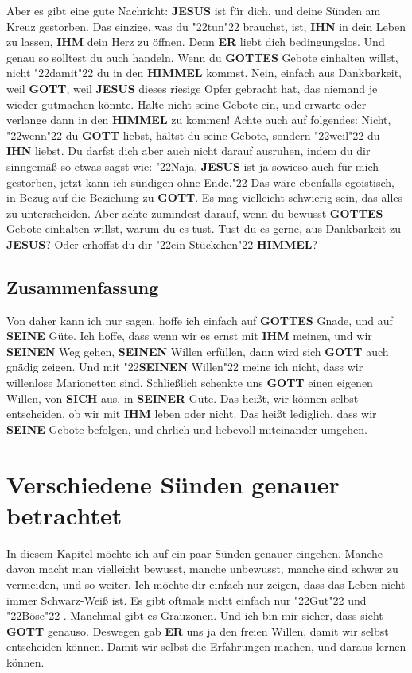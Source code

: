 \documentclass[10pt,a5paper]{article}
\newcommand{\Er}[0]{\textbf{ER}}
\newcommand{\Gottes}[0]{\textbf{GOTTES}}
\newcommand{\Gott}[0]{\textbf{GOTT}}
\newcommand{\Himmel}[0]{\textbf{HIMMEL}}
\newcommand{\Ihm}[0]{\textbf{IHM}}
\newcommand{\Ihn}[0]{\textbf{IHN}}
\newcommand{\Jesus}[0]{\textbf{JESUS}}
\newcommand{\Seinen}[0]{\textbf{SEINEN}}
\newcommand{\Seiner}[0]{\textbf{SEINER}}
\newcommand{\Seine}[0]{\textbf{SEINE}}
\newcommand{\Sich}[0]{\textbf{SICH}}
\newcommand{\q}[1]{\char"22{#1}\char"22 }
\begin{document}
		Aber es gibt eine gute Nachricht:
		{\Jesus} ist f\"ur dich,
		und deine S\"unden am Kreuz gestorben.
		Das einzige,
		was du \q{tun} brauchst,
		ist,
		{\Ihn} in dein Leben zu lassen,
		{\Ihm} dein Herz zu \"offnen.
		Denn {\Er} liebt dich bedingungslos.
		Und genau so solltest du auch handeln.
		Wenn du {\Gottes} Gebote einhalten willst,
		nicht \q{damit} du in den {\Himmel} kommst.
		Nein,
		einfach aus Dankbarkeit,
		weil {\Gott},
		weil {\Jesus} dieses riesige Opfer gebracht hat,
		das niemand je wieder gutmachen k\"onnte.
		Halte nicht seine Gebote ein,
		und erwarte oder verlange dann in den {\Himmel} zu kommen!
		Achte auch auf folgendes:
		Nicht,
		\q{wenn} du {\Gott} liebst, h\"altst du seine Gebote,
		sondern \q{weil} du {\Ihn} liebst.
		Du darfst dich aber auch nicht darauf ausruhen,
		indem du dir sinngem\"a{\ss} so etwas sagst wie:
		\q{Naja,
		{\Jesus} ist ja sowieso auch f\"ur mich gestorben,
		jetzt kann ich s\"undigen ohne Ende.}
		Das w\"are ebenfalls egoistisch,
		in Bezug auf die Beziehung zu {\Gott}.
		Es mag vielleicht schwierig sein,
		das alles zu unterscheiden.
		Aber achte zumindest darauf,
		wenn du bewusst {\Gottes} Gebote einhalten willst,
		warum du es tust.
		Tust du es gerne,
		aus Dankbarkeit zu {\Jesus}?
		Oder erhoffst du dir \q{ein St\"uckchen} {\Himmel}?
		
	\subsection{Zusammenfassung}
		Von daher kann ich nur sagen,
		hoffe ich einfach auf {\Gottes} Gnade,
		und auf {\Seine} G\"ute.
		Ich hoffe,
		dass wenn wir es ernst mit {\Ihm} meinen,
		und wir {\Seinen} Weg gehen,
		{\Seinen} Willen erf\"ullen,
		dann wird sich {\Gott} auch gn\"adig zeigen.
		Und mit \q{{\Seinen} Willen} meine ich nicht,
		dass wir willenlose Marionetten sind.
		Schlie{\ss}lich schenkte uns {\Gott} einen eigenen Willen,
		von {\Sich} aus,
		in {\Seiner} G\"ute.
		Das hei{\ss}t,
		wir k\"onnen selbst entscheiden,
		ob wir mit {\Ihm} leben oder nicht.
		Das hei{\ss}t lediglich,
		dass wir {\Seine} Gebote befolgen,
		und ehrlich und liebevoll miteinander umgehen.

	\newpage
	\section{Verschiedene S\"unden genauer betrachtet}
		In diesem Kapitel m\"ochte ich auf ein paar S\"unden genauer eingehen.
		Manche davon macht man vielleicht bewusst,
		manche unbewusst,
		manche sind schwer zu vermeiden,
		und so weiter.
		Ich m\"ochte dir einfach nur zeigen,
		dass das Leben nicht immer Schwarz-Wei{\ss} ist.
		Es gibt oftmals nicht einfach nur \q{Gut} und \q{B\"ose}.
		Manchmal gibt es Grauzonen.
		Und ich bin mir sicher,
		dass sieht {\Gott} genauso.
		Deswegen gab {\Er} uns ja den freien Willen,
		damit wir selbst entscheiden k\"onnen.
		Damit wir selbst die Erfahrungen machen,
		und daraus lernen k\"onnen.
	
\end{document}

